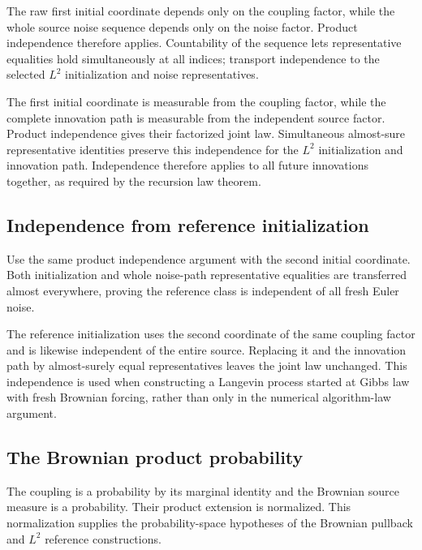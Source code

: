 \documentclass[11pt,a4paper]{report}
\begin{document}
The raw first initial coordinate depends only on the coupling factor, while the whole source noise sequence depends only on the noise factor. Product independence therefore applies. Countability of the sequence lets representative equalities hold simultaneously at all indices; transport independence to the selected \(L^2\) initialization and noise representatives.



The first initial coordinate is measurable from the coupling factor, while the complete innovation path is measurable from the independent source factor. Product independence gives their factorized joint law. Simultaneous almost-sure representative identities preserve this independence for the \(L^2\) initialization and innovation path. Independence therefore applies to all future innovations together, as required by the recursion law theorem.

\subsection{\texorpdfstring{Independence from reference initialization}{Independence from reference initialization}}
\label{report-step-UnadjustedLangevin-ProductBrownian-lean-17}


Use the same product independence argument with the second initial coordinate. Both initialization and whole noise-path representative equalities are transferred almost everywhere, proving the reference class is independent of all fresh Euler noise.



The reference initialization uses the second coordinate of the same coupling factor and is likewise independent of the entire source. Replacing it and the innovation path by almost-surely equal representatives leaves the joint law unchanged. This independence is used when constructing a Langevin process started at Gibbs law with fresh Brownian forcing, rather than only in the numerical algorithm-law argument.

\subsection{\texorpdfstring{The Brownian product probability}{The Brownian product probability}}
\label{report-step-UnadjustedLangevin-ProductBrownian-lean-18}


The coupling is a probability by its marginal identity and the Brownian source measure is a probability. Their product extension is normalized. This normalization supplies the probability-space hypotheses of the Brownian pullback and \(L^2\) reference constructions.
\end{document}
